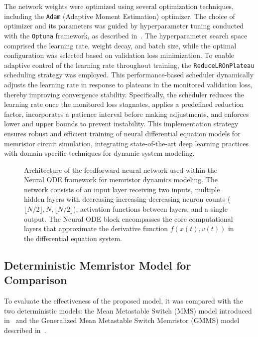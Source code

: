 \documentclass[11pt, oneside]{article}
\newcommand{\ua}{v}
\newcommand{\xw}{x}
\begin{document}
The network weights were optimized using several optimization techniques, including the \texttt{Adam} (Adaptive Moment Estimation) optimizer. The choice of optimizer and its parameters was guided by hyperparameter tuning conducted with the \texttt{Optuna} framework, as described in~\cite{Akiba2019}. The hyperparameter search space comprised the learning rate, weight decay, and batch size, while the optimal configuration was selected based on validation loss minimization. To enable adaptive control of the learning rate throughout training, the \texttt{ReduceLROnPlateau} scheduling strategy was employed. This performance-based scheduler dynamically adjusts the learning rate in response to plateaus in the monitored validation loss, thereby improving convergence stability. Specifically, the scheduler reduces the learning rate once the monitored loss stagnates, applies a predefined reduction factor, incorporates a patience interval before making adjustments, and enforces lower and upper bounds to prevent instability. This implementation strategy ensures robust and efficient training of neural differential equation models for memristor circuit simulation, integrating state-of-the-art deep learning practices with domain-specific techniques for dynamic system modeling.

\begin{figure}[ht!]
    \centering
    \resizebox{\linewidth}{!}{%
        
    }
    \caption{Architecture of the feedforward neural network used within the Neural ODE framework for memristor dynamics modeling. The network consists of an input layer receiving two inputs, multiple hidden layers with decreasing-increasing-decreasing neuron counts (\(\lfloor N/2 \rfloor, N, \lfloor N/2 \rfloor\)), activation functions between layers, and a single output. The Neural ODE block encompasses the core computational layers that approximate the derivative function \(f(\xw(t), \ua(t))\) in the differential equation system.}

    \label{fig:nn-arch}
\end{figure}


\subsection{Deterministic Memristor Model for Comparison}

To evaluate the effectiveness of the proposed model, it was compared with the two deterministic models: the Mean Metastable Switch (MMS) model introduced in~\cite{Minati2020} and the  Generalized Mean Metastable Switch Memristor (GMMS) model described in~\cite{Molter2016, Ostrovskii2021}.
\end{document}
